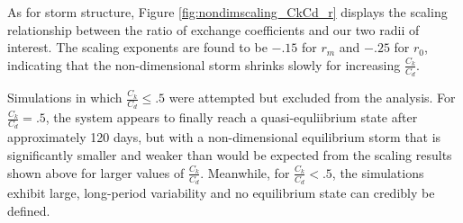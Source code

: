 \documentclass[12pt]{article}
\begin{document}
As for storm structure, Figure \ref{fig:nondimscaling_CkCd_r} displays the scaling relationship between the ratio of exchange coefficients and our two radii of interest.  The scaling exponents are found to be $-.15$ for $r_m$ and $-.25$ for $r_0$, indicating that the non-dimensional storm shrinks slowly for increasing $\frac{C_k}{C_d}$.

Simulations in which $\frac{C_k}{C_d} \le .5$ were attempted but excluded from the analysis. For $\frac{C_k}{C_d} = .5$, the system appears to finally reach a quasi-equliibrium state after approximately 120 days, but with a non-dimensional equilibrium storm that is significantly smaller and weaker than would be expected from the scaling results shown above for larger values of $\frac{C_k}{C_d}$. Meanwhile, for $\frac{C_k}{C_d} < .5$, the simulations exhibit large, long-period variability and no equilibrium state can credibly be defined.

\end{document}

